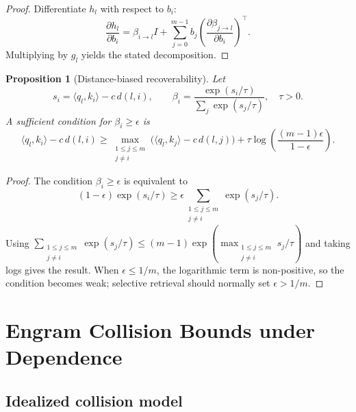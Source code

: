 \documentclass[11pt]{article}
\newtheorem{proposition}[theorem]{Proposition}
\begin{document}
\begin{proof}
Differentiate $h_l$ with respect to $b_i$:
\begin{equation}
\frac{\partial h_l}{\partial b_i}
= \beta_{i\to l}I + \sum_{j=0}^{m-1} b_j\left(\frac{\partial \beta_{j\to l}}{\partial b_i}\right)^\top.
\end{equation}
Multiplying by $g_l$ yields the stated decomposition.
\end{proof}

\begin{proposition}[Distance-biased recoverability]
\label{prop:attnres-margin}
Let
\begin{equation}
s_i=\langle q_l,k_i\rangle-c\,d(l,i),\qquad
\beta_i=\frac{\exp(s_i/\tau)}{\sum_{j}\exp(s_j/\tau)},\quad \tau>0.
\end{equation}
A sufficient condition for $\beta_i\geq\epsilon$ is
\begin{equation}
\langle q_l,k_i\rangle-c\,d(l,i)
\geq
\max_{\substack{1\le j\le m\\ j\ne i}}\big(\langle q_l,k_j\rangle-c\,d(l,j)\big)
+\tau\log\left(\frac{(m-1)\epsilon}{1-\epsilon}\right).
\end{equation}
\end{proposition}

\begin{proof}
The condition $\beta_i\geq\epsilon$ is equivalent to
\begin{equation}
(1-\epsilon)\exp(s_i/\tau)\geq \epsilon\sum_{\substack{1\le j\le m\\ j\ne i}}\exp(s_j/\tau).
\end{equation}
Using $\sum_{\substack{1\le j\le m\\ j\ne i}}\exp(s_j/\tau)\leq (m-1)\exp(\max_{\substack{1\le j\le m\\ j\ne i}}s_j/\tau)$ and taking logs gives the result. When $\epsilon\leq 1/m$, the logarithmic term is non-positive, so the condition becomes weak; selective retrieval should normally set $\epsilon>1/m$.
\end{proof}

\section{Engram Collision Bounds under Dependence}
\label{app:engram}

\subsection{Idealized collision model}
\end{document}
